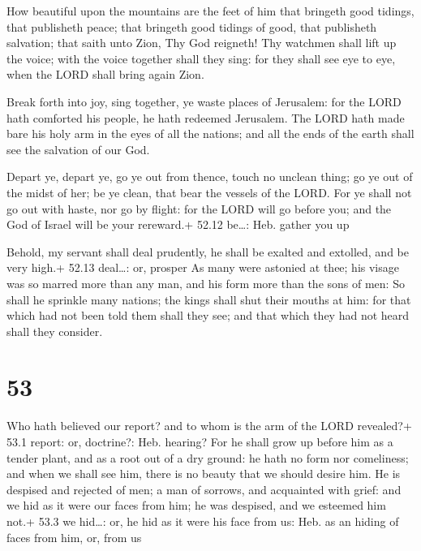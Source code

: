  How beautiful upon the mountains are the feet of him that
bringeth good tidings, that publisheth peace; that bringeth good tidings
of good, that publisheth salvation; that saith unto Zion, Thy God
reigneth!  Thy watchmen shall lift up the voice; with the
voice together shall they sing: for they shall see eye to eye, when the
LORD shall bring again Zion.

 Break forth into joy, sing together, ye waste places of
Jerusalem: for the LORD hath comforted his people, he hath redeemed
Jerusalem.  The LORD hath made bare his holy arm in the
eyes of all the nations; and all the ends of the earth shall see the
salvation of our God.

 Depart ye, depart ye, go ye out from thence, touch no
unclean thing; go ye out of the midst of her; be ye clean, that bear the
vessels of the LORD.  For ye shall not go out with haste,
nor go by flight: for the LORD will go before you; and the God of Israel
will be your rereward.+ 52.12 be\ldots: Heb. gather you up

 Behold, my servant shall deal prudently, he shall be
exalted and extolled, and be very high.+ 52.13 deal\ldots: or, prosper
 As many were astonied at thee; his visage was so marred
more than any man, and his form more than the sons of men: 
So shall he sprinkle many nations; the kings shall shut their mouths at
him: for that which had not been told them shall they see; and that
which they had not heard shall they consider.

\hypertarget{section-52}{%
\section{53}\label{section-52}}

 Who hath believed our report? and to whom is the arm of the
LORD revealed?+ 53.1 report: or, doctrine?: Heb. hearing? 
For he shall grow up before him as a tender plant, and as a root out of
a dry ground: he hath no form nor comeliness; and when we shall see him,
there is no beauty that we should desire him.  He is
despised and rejected of men; a man of sorrows, and acquainted with
grief: and we hid as it were our faces from him; he was despised, and we
esteemed him not.+ 53.3 we hid\ldots: or, he hid as it were his face
from us: Heb. as an hiding of faces from him, or, from us

